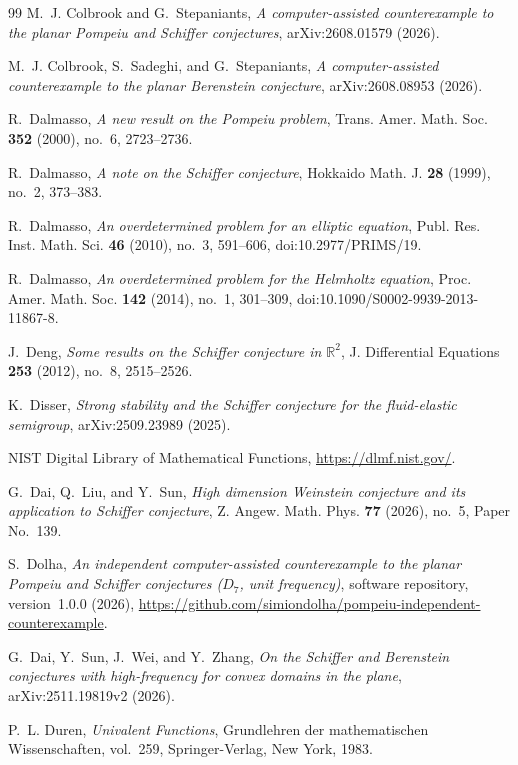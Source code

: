\documentclass[11pt]{amsart}
\theoremstyle{definition}
\theoremstyle{remark}
\numberwithin{equation}{section}
\begin{document}
\begin{thebibliography}{99}
M.~J. Colbrook and G.~Stepaniants, \emph{A computer-assisted counterexample to the planar Pompeiu and Schiffer conjectures}, arXiv:2608.01579 (2026).

M.~J. Colbrook, S.~Sadeghi, and G.~Stepaniants, \emph{A computer-assisted counterexample to the planar Berenstein conjecture}, arXiv:2608.08953 (2026).

R.~Dalmasso, \emph{A new result on the Pompeiu problem}, Trans. Amer. Math. Soc. \textbf{352} (2000), no.~6, 2723--2736.

R.~Dalmasso, \emph{A note on the Schiffer conjecture}, Hokkaido Math. J. \textbf{28} (1999), no.~2, 373--383.

R.~Dalmasso, \emph{An overdetermined problem for an elliptic equation}, Publ. Res. Inst. Math. Sci. \textbf{46} (2010), no.~3, 591--606, doi:10.2977/PRIMS/19.

R.~Dalmasso, \emph{An overdetermined problem for the Helmholtz equation}, Proc. Amer. Math. Soc. \textbf{142} (2014), no.~1, 301--309, doi:10.1090/S0002-9939-2013-11867-8.

J.~Deng, \emph{Some results on the Schiffer conjecture in $\mathbb R^2$}, J. Differential Equations \textbf{253} (2012), no.~8, 2515--2526.

K.~Disser, \emph{Strong stability and the Schiffer conjecture for the fluid-elastic semigroup}, arXiv:2509.23989 (2025).

NIST Digital Library of Mathematical Functions, \url{https://dlmf.nist.gov/}.

G.~Dai, Q.~Liu, and Y.~Sun, \emph{High dimension Weinstein conjecture and its application to Schiffer conjecture}, Z. Angew. Math. Phys. \textbf{77} (2026), no.~5, Paper No.~139.

S.~Dolha, \emph{An independent computer-assisted counterexample to the planar Pompeiu and Schiffer conjectures \textup{(}$D_7$, unit frequency\textup{)}}, software repository, version~1.0.0 (2026), \url{https://github.com/simiondolha/pompeiu-independent-counterexample}.

G.~Dai, Y.~Sun, J.~Wei, and Y.~Zhang, \emph{On the Schiffer and Berenstein conjectures with high-frequency for convex domains in the plane}, arXiv:2511.19819v2 (2026).

P.~L. Duren, \emph{Univalent Functions}, Grundlehren der mathematischen Wissenschaften, vol.~259, Springer-Verlag, New York, 1983.


\end{thebibliography}
\end{document}
